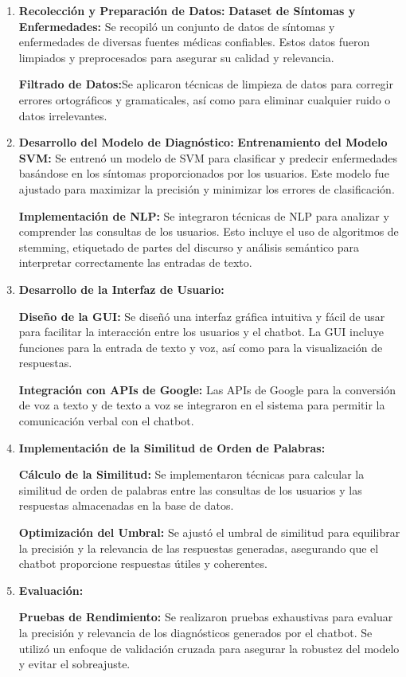 \begin{enumerate}
	
	\item \textbf{Recolección y Preparación de Datos:}
		\subitem \textbf{Dataset de Síntomas y Enfermedades:} Se recopiló un conjunto de datos de síntomas y enfermedades de diversas fuentes médicas confiables. Estos datos fueron limpiados y preprocesados para asegurar su calidad y relevancia.
		
		\subitem \textbf{Filtrado de Datos:}Se aplicaron técnicas de limpieza de datos para corregir errores ortográficos y gramaticales, así como para eliminar cualquier ruido o datos irrelevantes.
	
	\item \textbf{Desarrollo del Modelo de Diagnóstico:}
		\subitem \textbf{Entrenamiento del Modelo SVM:} Se entrenó un modelo de SVM para clasificar y predecir enfermedades basándose en los síntomas proporcionados por los usuarios. Este modelo fue ajustado para maximizar la precisión y minimizar los errores de clasificación.
		
		\subitem \textbf{Implementación de NLP:} Se integraron técnicas de NLP para analizar y comprender las consultas de los usuarios. Esto incluye el uso de algoritmos de stemming, etiquetado de partes del discurso y análisis semántico para interpretar correctamente las entradas de texto.
	
	\item \textbf{Desarrollo de la Interfaz de Usuario:}
	
		\subitem \textbf{Diseño de la GUI:} Se diseñó una interfaz gráfica intuitiva y fácil de usar para facilitar la interacción entre los usuarios y el chatbot. La GUI incluye funciones para la entrada de texto y voz, así como para la visualización de respuestas.
		
		\subitem \textbf{Integración con APIs de Google:} Las APIs de Google para la conversión de voz a texto y de texto a voz se integraron en el sistema para permitir la comunicación verbal con el chatbot.
	
	\item \textbf{Implementación de la Similitud de Orden de Palabras:}
	
		\subitem \textbf{Cálculo de la Similitud:} Se implementaron técnicas para calcular la similitud de orden de palabras entre las consultas de los usuarios y las respuestas almacenadas en la base de datos.
	
		\subitem \textbf{Optimización del Umbral:} Se ajustó el umbral de similitud para equilibrar la precisión y la relevancia de las respuestas generadas, asegurando que el chatbot proporcione respuestas útiles y coherentes.
			
	\item \textbf{Evaluación:}
	
		\subitem \textbf{Pruebas de Rendimiento:} Se realizaron pruebas exhaustivas para evaluar la precisión y relevancia de los diagnósticos generados por el chatbot. Se utilizó un enfoque de validación cruzada para asegurar la robustez del modelo y evitar el sobreajuste. 
	
\end{enumerate}

